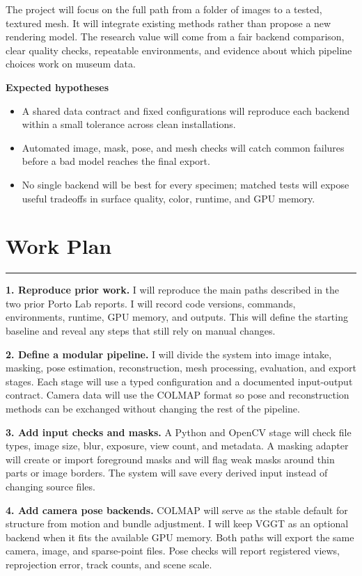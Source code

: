 \documentclass[10pt]{article}
\newcommand{\sectionrule}{\vspace{-4pt}\color{rulegray}\hrule\color{black}\vspace{5pt}}
\begin{document}
The project will focus on the full path from a folder of images to a tested, textured mesh. It will integrate existing methods rather than propose a new rendering model. The research value will come from a fair backend comparison, clear quality checks, repeatable environments, and evidence about which pipeline choices work on museum data.

\textbf{Expected hypotheses}

\begin{itemize}
    \item A shared data contract and fixed configurations will reproduce each backend within a small tolerance across clean installations.
    \item Automated image, mask, pose, and mesh checks will catch common failures before a bad model reaches the final export.
    \item No single backend will be best for every specimen; matched tests will expose useful tradeoffs in surface quality, color, runtime, and GPU memory.
\end{itemize}

\section*{Work Plan}
\sectionrule

\textbf{1. Reproduce prior work.} I will reproduce the main paths described in the two prior Porto Lab reports. I will record code versions, commands, environments, runtime, GPU memory, and outputs. This will define the starting baseline and reveal any steps that still rely on manual changes.

\textbf{2. Define a modular pipeline.} I will divide the system into image intake, masking, pose estimation, reconstruction, mesh processing, evaluation, and export stages. Each stage will use a typed configuration and a documented input-output contract. Camera data will use the COLMAP format so pose and reconstruction methods can be exchanged without changing the rest of the pipeline.

\textbf{3. Add input checks and masks.} A Python and OpenCV stage will check file types, image size, blur, exposure, view count, and metadata. A masking adapter will create or import foreground masks and will flag weak masks around thin parts or image borders. The system will save every derived input instead of changing source files.

\textbf{4. Add camera pose backends.} COLMAP will serve as the stable default for structure from motion and bundle adjustment. I will keep VGGT as an optional backend when it fits the available GPU memory. Both paths will export the same camera, image, and sparse-point files. Pose checks will report registered views, reprojection error, track counts, and scene scale.
\end{document}

